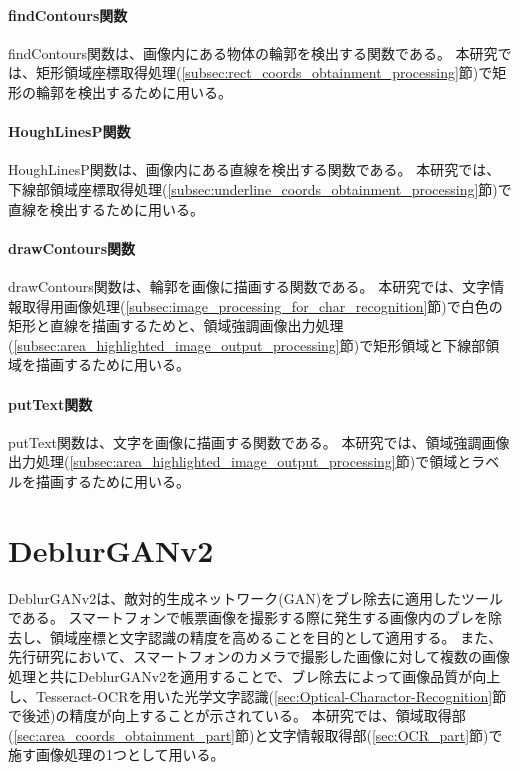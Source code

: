 \paragraph{findContours関数}
findContours関数は、画像内にある物体の輪郭を検出する関数である。
本研究では、矩形領域座標取得処理(\ref{subsec:rect_coords_obtainment_processing}節)で矩形の輪郭を検出するために用いる。

\paragraph{HoughLinesP関数}
HoughLinesP関数は、画像内にある直線を検出する関数である。
本研究では、下線部領域座標取得処理(\ref{subsec:underline_coords_obtainment_processing}節)で直線を検出するために用いる。

\paragraph{drawContours関数}
drawContours関数は、輪郭を画像に描画する関数である。
本研究では、文字情報取得用画像処理(\ref{subsec:image_processing_for_char_recognition}節)で白色の矩形と直線を描画するためと、領域強調画像出力処理(\ref{subsec:area_highlighted_image_output_processing}節)で矩形領域と下線部領域を描画するために用いる。

\paragraph{putText関数}
putText関数は、文字を画像に描画する関数である。
本研究では、領域強調画像出力処理(\ref{subsec:area_highlighted_image_output_processing}節)で領域とラベルを描画するために用いる。

\section{DeblurGANv2}\label{sec:DeblurGANv2}
DeblurGANv2は、敵対的生成ネットワーク(GAN)をブレ除去に適用したツールである\cite{DeblurGANv2}。
スマートフォンで帳票画像を撮影する際に発生する画像内のブレを除去し、領域座標と文字認識の精度を高めることを目的として適用する。
また、先行研究において、スマートフォンのカメラで撮影した画像に対して複数の画像処理と共にDeblurGANv2を適用することで、ブレ除去によって画像品質が向上し、Tesseract-OCRを用いた光学文字認識(\ref{sec:Optical-Charactor-Recognition}節で後述)の精度が向上することが示されている\cite{DeblurGANv2の先行研究}。
本研究では、領域取得部(\ref{sec:area_coords_obtainment_part}節)と文字情報取得部(\ref{sec:OCR_part}節)で施す画像処理の1つとして用いる。


